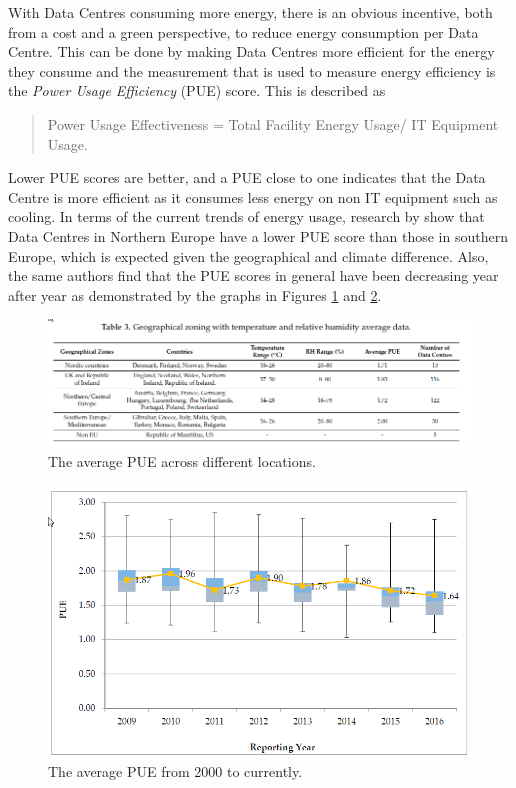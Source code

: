 \documentclass[12pt]{scrartcl}
\begin{document}
With Data Centres consuming more energy, there is an obvious incentive, both from a cost and a green perspective, to reduce energy consumption per Data Centre. This can be done by making Data Centres more efficient for the energy they consume and the measurement that is used to measure energy efficiency is the \emph{Power Usage Efficiency} (PUE) score. This is described as

\begin{quotation} 
Power Usage Effectiveness = Total Facility Energy Usage/ IT Equipment Usage.
\end{quotation}

Lower PUE scores are better, and a PUE close to one indicates that the Data Centre is more efficient as it consumes less energy on non IT equipment such as cooling. 
In terms of the current trends of energy usage, research by \citet{edsbas.13818AC20170101} show that Data Centres in Northern Europe have a lower PUE score than those in southern Europe, which is expected given the geographical and climate difference. Also, the same authors find that the PUE scores in general have been decreasing year after year as demonstrated by the graphs in Figures \ref{fig:PUE-by-location} and \ref{fig:PUE-by-year}.

\begin{figure}[h]
  \caption{The average PUE across different locations.}
  \label{fig:PUE-by-location}
  \centering
    \includegraphics[scale=0.45]{geographical_zoning}
\end{figure}

\begin{figure}[h]
  \caption{The average PUE from 2000 to currently.}
  \label{fig:PUE-by-year}
  \centering
    \includegraphics[scale=0.35]{Average_PUE_per_reporting_year}
\end{figure}
 
\end{document}
